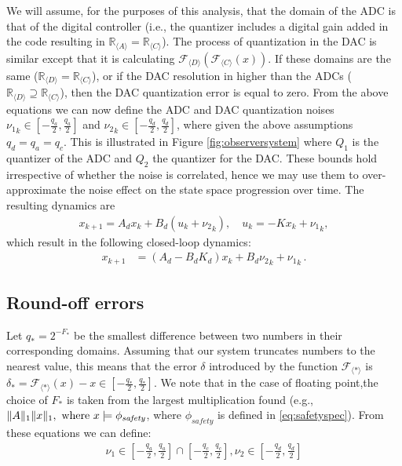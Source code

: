 \documentclass[a4paper,UKenglish]{lipics-v2018}
\DeclarePairedDelimiter\norm{\lVert}{\rVert}
\newcommand{\mat}[1]{{#1}}
\renewcommand{\vec}[1]{{#1}}
\begin{document}
We will assume, for the purposes of this analysis, that the domain of the
ADC is that of the digital controller (i.e., the quantizer includes a digital
gain added in the code resulting in $\mathbb{R}_{\langle A
\rangle}=\mathbb{R}_{\langle C \rangle}$).  The process of quantization in
the DAC is similar except that it is calculating $\mathcal{F}_{\langle
D\rangle} (\mathcal{F}_{\langle C \rangle} (x)) $.  If these domains are the
same ($\mathbb{R}_{\langle D \rangle}=\mathbb{R}_{\langle C \rangle}$), or
if the DAC resolution in higher than the ADCs ($\mathbb{R}_{\langle D
\rangle}\supseteq\mathbb{R}_{\langle C \rangle}$), then the DAC quantization
error is equal to zero.  From the above equations we can now define the ADC
and DAC quantization noises ${\nu_1}_k \in [-\frac{q_a}{2}, \frac{q_a}{2}]$
and ${\nu_2}_k \in [-\frac{q_d}{2}, \frac{q_d}{2}]$, where given the above
assumptions $q_d=q_a=q_c$.  This is illustrated in Figure
\ref{fig:observersystem} where $Q_1$ is the quantizer of the ADC and $Q_2$
the quantizer for the DAC.  These bounds hold irrespective of whether the
noise is correlated, hence we may use them to over-approximate the noise
effect on the state space progression over time.  The resulting dynamics are
%
\begin{align*}
\vec{x}_{k+1} = \mat{A}_d\vec{x}_k+\mat{B}_d({u}_k+{{\nu}_2}_k), \quad u_k = -\mat{K}\vec{x}_{k}+{{\nu}_1}_k, 
\end{align*}
%
which result in the following closed-loop dynamics:
%
\begin{align*}
\vec{x}_{k+1} &= (\mat{A}_d-\mat{B}_d\mat{K}_d) \vec{x}_k+\mat{B}_d{{\nu}_2}_k +{{\nu}_1}_k \,. 
\end{align*}

\subsection{Round-off errors}
\label{sec:roundoff-noise}

Let $q_*=2^{-F_*}$ be the smallest difference
between two numbers in their corresponding domains.  Assuming that our
system truncates numbers to the nearest value, this means that the error
$\delta$ introduced by the function $\mathcal{F}_{\langle * \rangle}$ is
$\delta_*=\mathcal{F}_{\langle * \rangle}(x)-x \in \left[-\frac{q_*}{2}, 
\frac{q_*}{2}\right]$.
We note that in the case of floating point,the
choice of $F_*$ is taken from the largest multiplication found (e.g.,
$\norm{\mat{A}}_1\norm{\vec{x}}_1, \text{ where }  \vec{x} \models \phi_\mathit{safety}$,
where $\phi_\mathit{safety}$ is defined in \ref{eq:safetyspec}). From these
equations we can define:
%
\begin{align*}
\nu_1 \in \left[-\frac{q_a}{2}, \frac{q_a}{2}\right] \cap  \left[-\frac{q_c}{2}, \frac{q_c}{2}\right],
\nu_2 \in \left[-\frac{q_d}{2}, \frac{q_d}{2}\right]
\end{align*}
\end{document}
